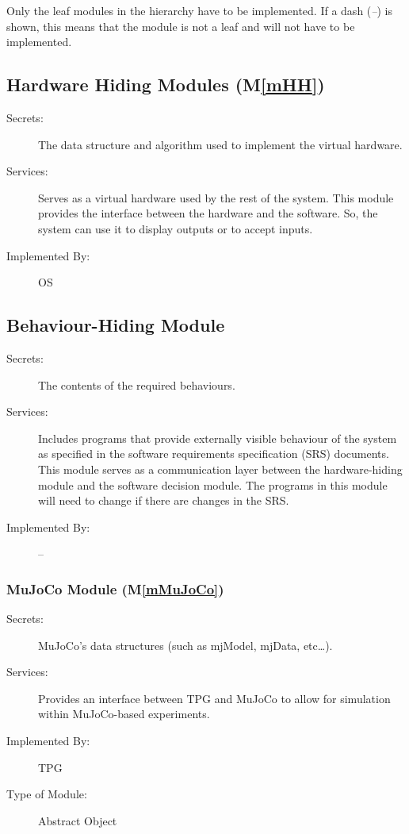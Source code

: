 \documentclass[12pt, titlepage]{article}
\newcommand{\mref}[1]{M\ref{#1}}
\begin{document}
Only the leaf modules in the hierarchy have to be implemented. If a dash
(\emph{--}) is shown, this means that the module is not a leaf and will not have
to be implemented.

\subsection{Hardware Hiding Modules (\mref{mHH})}

\begin{description}
\item[Secrets:]The data structure and algorithm used to implement the virtual
  hardware.
\item[Services:]Serves as a virtual hardware used by the rest of the
  system. This module provides the interface between the hardware and the
  software. So, the system can use it to display outputs or to accept inputs.
\item[Implemented By:] OS
\end{description}

\subsection{Behaviour-Hiding Module}

\begin{description}
\item[Secrets:]The contents of the required behaviours.
\item[Services:]Includes programs that provide externally visible behaviour of
  the system as specified in the software requirements specification (SRS)
  documents. This module serves as a communication layer between the
  hardware-hiding module and the software decision module. The programs in this
  module will need to change if there are changes in the SRS.
\item[Implemented By:] --
\end{description}

\subsubsection{MuJoCo Module (\mref{mMuJoCo})}

\begin{description}
\item[Secrets:]MuJoCo's data structures (such as mjModel, mjData, etc…).
\item[Services:]Provides an interface between TPG and MuJoCo to allow for simulation within MuJoCo-based experiments.
\item[Implemented By:] TPG
\item[Type of Module:] Abstract Object
\end{description}
\end{document}
